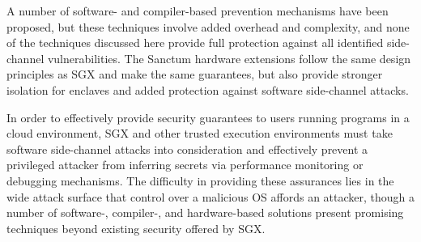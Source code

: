 A number of software- and compiler-based prevention mechanisms have been proposed, but these techniques involve added overhead and complexity, and none of the techniques discussed here provide full protection against all identified side-channel vulnerabilities. The Sanctum hardware extensions follow the same design principles as SGX and make the same guarantees, but also provide stronger isolation for enclaves and added protection against software side-channel attacks. 

In order to effectively provide security guarantees to users running programs in a cloud environment, SGX and other trusted execution environments must take software side-channel attacks into consideration and effectively prevent a privileged attacker from inferring secrets via performance monitoring or debugging mechanisms. The difficulty in providing these assurances lies in the wide attack surface that control over a malicious OS affords an attacker, though a number of software-, compiler-, and hardware-based solutions present promising techniques beyond existing security offered by SGX. 
